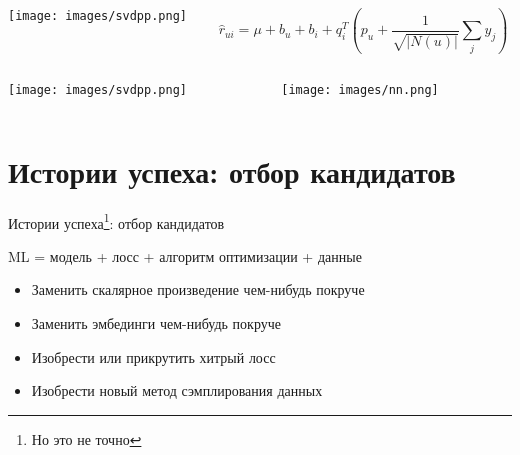 \documentclass[11pt,aspectratio=169,handout]{beamer}
\begin{document}
\begin{frame}

\begin{columns}
\begin{column}{0.47\textwidth}
\begin{center}
\texttt{[image: images/svdpp.png]}
\end{center}
\end{column}
\begin{column}{0.47\textwidth}
\begin{small}
\[
\hat r_{ui} = \mu + b_u + b_i + q_i^T \left( p_u + \frac{1}{\sqrt{|N(u)|}} \sum_j y_j \right)
\]
\end{small}
\end{column}
\end{columns}

\end{frame}

\begin{frame}

\begin{columns}
\begin{column}{0.47\textwidth} 
\begin{center}
\texttt{[image: images/svdpp.png]}
\end{center}
\end{column}
\begin{column}{0.47\textwidth}
\begin{center}
\texttt{[image: images/nn.png]}
\end{center}
\end{column}
\end{columns}

\end{frame}

\section{Истории успеха: отбор кандидатов}

\begin{frame}{Истории успеха\footnote{Но это не точно}: отбор кандидатов}

ML = модель + лосс + алгоритм оптимизации + данные

\vfill

\begin{tcolorbox}[colback=info!5,colframe=info!80,title=Как оставить след в науке]
\pause
\begin{itemize}[<+->]
\item Заменить скалярное произведение чем-нибудь покруче
\item Заменить эмбединги чем-нибудь покруче
\item Изобрести или прикрутить хитрый лосс
\item Изобрести новый метод сэмплирования данных
\end{itemize}
\end{tcolorbox}

\end{frame}
\end{document}

